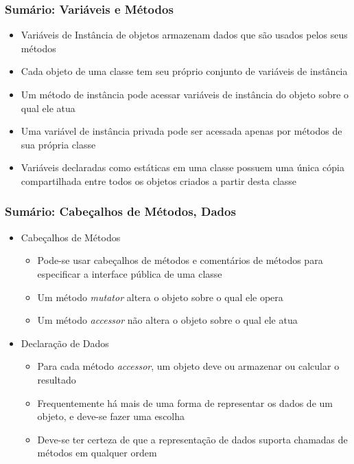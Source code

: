 \documentclass[xcolor={dvipsnames,table},aspectratio=169]{beamer}
\begin{document}
\begin{frame}\frametitle{Sumário: Variáveis e Métodos}
\begin{itemize}
	\item Variáveis de Instância de objetos armazenam dados que são usados pelos seus métodos
	\item Cada objeto de uma classe tem seu próprio conjunto de variáveis de instância
	\item Um método de instância pode acessar variáveis de instância do objeto sobre o qual ele atua
	\item Uma variável de instância privada pode ser acessada apenas por métodos de sua própria classe
	\item Variáveis declaradas como estáticas em uma classe possuem uma única cópia compartilhada entre todos os objetos criados a partir desta classe
\end{itemize}
\end{frame}

\begin{frame}\frametitle{Sumário: Cabeçalhos de Métodos, Dados}
\begin{itemize}
	\item Cabeçalhos de Métodos
	\begin{itemize}
		\item Pode-se usar cabeçalhos de métodos e comentários de métodos para especificar a interface pública de uma classe
		\item Um método \emph{mutator} altera o objeto sobre o qual ele opera
		\item Um método \emph{accessor} não altera o objeto sobre o qual ele atua
	\end{itemize}
	\item Declaração de Dados
	\begin{itemize}
		\item Para cada método \emph{accessor}, um objeto deve ou armazenar ou calcular o resultado
		\item Frequentemente há mais de uma forma de representar os dados de um objeto, e deve-se fazer uma escolha
		\item Deve-se ter certeza de que a representação de dados suporta chamadas de métodos em qualquer ordem
	\end{itemize}
\end{itemize}
\end{frame}
\end{document}
